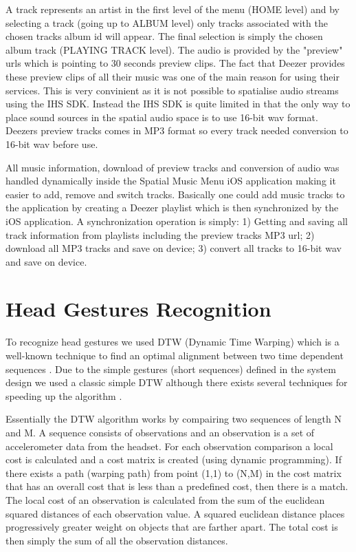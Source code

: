 A track represents an artist in the first level of the menu (HOME level) and by selecting a track (going up to ALBUM level) only tracks associated with the chosen tracks album id will appear. The final selection is simply the chosen album track (PLAYING TRACK level). The audio is provided by the "preview" urls which is pointing to 30 seconds preview clips. The fact that Deezer provides these preview clips of all their music was one of the main reason for using their services. This is very convinient as it is not possible to spatialise audio streams using the IHS SDK. Instead the IHS SDK is quite limited in that the only way to place sound sources in the spatial audio space is to use 16-bit wav format. Deezers preview tracks comes in MP3 format so every track needed conversion to 16-bit wav before use. 

All music information, download of preview tracks and conversion of audio was handled dynamically inside the Spatial Music Menu iOS application making it easier to add, remove and switch tracks. Basically one could add music tracks to the application by creating a Deezer playlist which is then synchronized by the iOS application. A synchronization operation is simply: 1) Getting and saving all track information from playlists including the preview tracks MP3 url; 2) download all MP3 tracks and save on device; 3) convert all tracks to 16-bit wav and save on device.


\section{Head Gestures Recognition}
To recognize head gestures we used DTW (Dynamic Time Warping) which is a well-known technique to find an optimal alignment between two time dependent sequences \cite{muller_dynamic_2007}. Due to the simple gestures (short sequences) defined in the system design we used a classic simple DTW although there exists several techniques for speeding up the algorithm \cite{muller_dynamic_2007,salvador_toward_2007,akl_accelerometer-based_2010}. 

Essentially the DTW algorithm works by compairing two sequences of length N and M. A sequence consists of observations and an observation is a set of accelerometer data from the headset. For each observation comparison a local cost is calculated and a cost matrix is created (using dynamic programming). If there exists a path (warping path) from point (1,1) to (N,M) in the cost matrix that has an overall cost that is less than a predefined cost, then there is a match. The local cost of an observation is calculated from the sum of the euclidean squared distances of each observation value. A squared euclidean distance places progressively greater weight on objects that are farther apart. The total cost is then simply the sum of all the observation distances.

